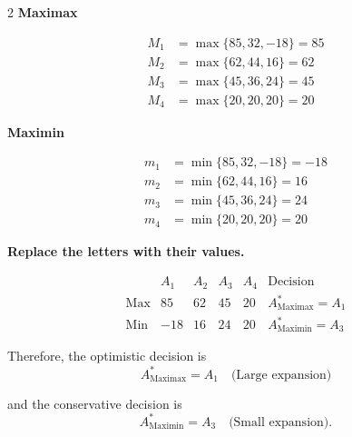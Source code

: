 {\begin{multicols}{2}
			\textbf{Maximax}
			
			\[
			\begin{array}{ll}
				M_1 &= \max\{85,32,-18\}=85\\
				M_2 &= \max\{62,44,16\}=62\\
				M_3 &= \max\{45,36,24\}=45\\
				M_4 &= \max\{20,20,20\}=20
			\end{array}
			\]
			
			\textbf{Maximin}
			
			\[
			\begin{array}{ll}
				m_1 &= \min\{85,32,-18\}=-18\\
				m_2 &= \min\{62,44,16\}=16\\
				m_3 &= \min\{45,36,24\}=24\\
				m_4 &= \min\{20,20,20\}=20
			\end{array}
			\]
			
			\columnbreak
			
			\textbf{Replace the letters with their values.}
			
			\[
			\begin{array}{c|ccccc}
				& A_1 & A_2 & A_3 & A_4 & \text{Decision}\\
				\hline
				\text{Max} &
				85 & 62 & 45 & 20 &
				A^*_{\mathrm{Maximax}}=A_1
				\\
				\text{Min} &
				-18 & 16 & 24 & 20 &
				A^*_{\mathrm{Maximin}}=A_3
			\end{array}
			\]
			
			Therefore, the optimistic decision is
			\[
			A^*_{\mathrm{Maximax}}=A_1
			\quad\text{(Large expansion)}
			\]
			
			and the conservative decision is
			\[
			A^*_{\mathrm{Maximin}}=A_3
			\quad\text{(Small expansion)}.
			\]
			
		\end{multicols}
	}
	

